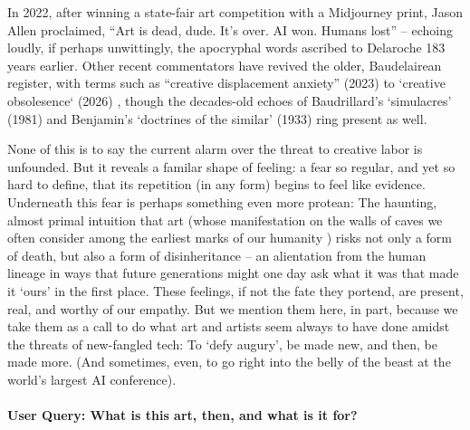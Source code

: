 \documentclass{article}
\begin{document}
In 2022, after winning a state-fair art competition with a Midjourney print, Jason Allen proclaimed, ``Art is dead, dude. It's over. AI won. Humans lost'' \citep{roose2022aiart} -- echoing loudly, if perhaps unwittingly, the apocryphal words ascribed to Delaroche 183 years earlier. Other recent commentators have revived the older, Baudelairean register, with terms such as ``creative displacement anxiety'' (2023) \citep{caporusso2023displacement} to `creative obsolesence` (2026) \citep{brainard2026artificial}, though the decades-old echoes of Baudrillard's `simulacres' (1981) \citep{baudrillard1981simulacres} and Benjamin's `doctrines of the similar' (1933) \citep{benjamin1979doctrine} ring present as well.

None of this is to say the current alarm over the threat to creative labor is unfounded. But it reveals a familar shape of feeling: a fear so regular, and yet so hard to define, that its repetition (in any form) begins to feel like evidence. Underneath this fear is perhaps something even more protean: The haunting, almost primal intuition that art (whose manifestation on the walls of caves we often consider among the earliest marks of our humanity \citep{whitley2009cave}) risks not only a form of death, but also a form of disinheritance -- an alientation from the human lineage in ways that future generations might one day ask what it was that made it `ours' in the first place. These feelings, if not the fate they portend, are present, real, and worthy of our empathy. But we mention them here, in part, because we take them as a call to do what art and artists seem always to have done amidst the threats of new-fangled tech: To `defy augury', be made new, and then, be made more. (And sometimes, even, to go right into the belly of the beast at the world's largest AI conference).

\paragraph{User Query: What is this art, then, and what is it for?}
\end{document}
